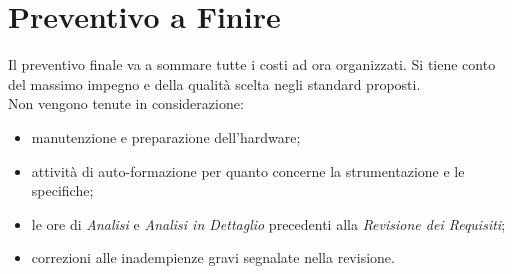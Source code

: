 \documentclass[12pt,a4paper,titlepage]{article}
\begin{document}
	
	
	
	\newpage
	
	\section{Preventivo a Finire}
	Il preventivo finale va a sommare tutte i costi ad ora organizzati. Si tiene conto del massimo impegno e della qualità scelta negli standard proposti. \\
	Non vengono tenute in considerazione:
	\begin{itemize}
		\item manutenzione e preparazione dell'hardware;
		\item attività di auto-formazione per quanto concerne la strumentazione e le specifiche;
		\item le ore di \textit{Analisi} e \textit{Analisi in Dettaglio} precedenti alla \textit{Revisione dei Requisiti};
		\item correzioni alle inadempienze gravi segnalate nella revisione.
	\end{itemize}
\end{document}
